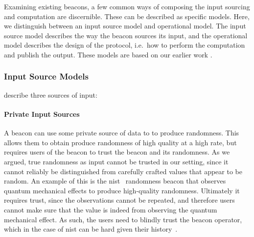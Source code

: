 Examining existing beacons, a few common ways of composing the input sourcing and computation are discernible.
These can be described as specific models.
Here, we distinguish between an input source model and operational model. The input source model describes the way the beacon sources its input, and the operational model describes the design of the protocol, i.e.\ how to perform the computation and publish the output. These models are based on our earlier work .

\subsubsection{Input Source Models}
 describe three sources of input:

\paragraph{Private Input Sources} A beacon can use some private source of data to to produce randomness. This allows them to obtain produce randomness of high quality at a high rate, but requires users of the beacon to trust the beacon and its randomness.
As we argued, true randomness as input cannot be trusted in our setting, since it cannot reliably be distinguished from carefully crafted values that appear to be random.
An example of this is the \gls{nist}~\cite{nistbeacon} randomness beacon that observes quantum mechanical effects to produce high-quality randomness.
Ultimately it requires trust, since the observations cannot be repeated, and therefore users cannot make sure that the value is indeed from observing the quantum mechanical effect.
As such, the users need to blindly trust the beacon operator, which in the case of \gls{nist} can be hard given their history~\cite{nytimes-nsabackdoors, nytimes-nsaconstants, nist2014backdoor}.


